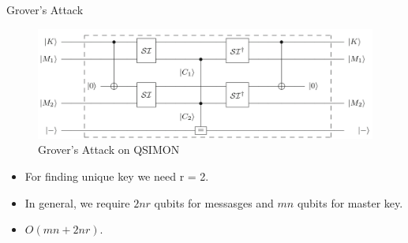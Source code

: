 \begin{frame}{Grover's Attack}
    \begin{figure}[h!]
    \centering
    \includegraphics[width=\linewidth]{simon/qsimgrov.png}
    \caption{Grover's Attack on QSIMON \cite{gos}}
    \label{fig:qsimgrov}
\end{figure}
\begin{itemize}
    \item For finding unique key we need r = 2.
    \pause
    \item  In general, we require $2nr$ qubits for messasges and $mn$ qubits for master key.
    \pause
    \item $O(mn + 2nr)$.
\end{itemize}
\end{frame}